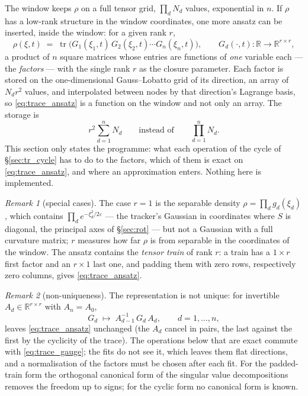 \documentclass[11pt,a4paper]{article}
\newcommand{\R}{\mathbb{R}}
\newcommand{\tr}{\operatorname{tr}}
\newcommand{\eps}{\varepsilon}
\theoremstyle{plain}
\theoremstyle{definition}
\theoremstyle{remark}
\newtheorem{remark}{Remark}
\begin{document}
The window keeps $\rho$ on a full tensor grid, $\prod_dN_d$ values, exponential in $n$. If $\rho$ has a low-rank structure in the window coordinates, one more ansatz can be inserted, inside the window: for a given rank $r$,
\begin{equation}
  \boxed{\;\rho(\xi,t) \;=\; \tr\big(G_1(\xi_1,t)\,G_2(\xi_2,t)\cdots G_n(\xi_n,t)\big),
  \qquad G_d(\cdot,t):\R\to\R^{r\times r},\;}
  \label{eq:trace_ansatz}
\end{equation}
a product of $n$ square matrices whose entries are functions of \emph{one} variable each --- the \emph{factors} --- with the single rank $r$ as the closure parameter. Each factor is stored on the one-dimensional Gauss--Lobatto grid of its direction, an array of $N_dr^2$ values, and interpolated between nodes by that direction's Lagrange basis, so \eqref{eq:trace_ansatz} is a function on the window and not only an array. The storage is
\begin{equation}
  r^2\sum_{d=1}^nN_d \qquad\text{instead of}\qquad \prod_{d=1}^nN_d .
  \label{eq:trace_storage}
\end{equation}
This section only states the programme: what each operation of the cycle of \S\ref{sec:tr_cycle} has to do to the factors, which of them is exact on \eqref{eq:trace_ansatz}, and where an approximation enters. Nothing here is implemented.

\begin{remark}[special cases]
The case $r=1$ is the separable density $\rho=\prod_dg_d(\xi_d)$, which contains $\prod_de^{-\xi_d^2/2\eps}$ --- the tracker's Gaussian in coordinates where $S$ is diagonal, the principal axes of \S\ref{sec:rot} --- but not a Gaussian with a full curvature matrix; $r$ measures how far $\rho$ is from separable in the coordinates of the window. The ansatz contains the \emph{tensor train} of rank $r$: a train has a $1\times r$ first factor and an $r\times1$ last one, and padding them with zero rows, respectively zero columns, gives \eqref{eq:trace_ansatz}.
\end{remark}

\begin{remark}[non-uniqueness]
\label{rem:gauge}
The representation is not unique: for invertible $A_d\in\R^{r\times r}$ with $A_n=A_0$,
\begin{equation}
  G_d \;\mapsto\; A_{d-1}^{-1}\,G_d\,A_d, \qquad d=1,\dots,n,
  \label{eq:trace_gauge}
\end{equation}
leaves \eqref{eq:trace_ansatz} unchanged (the $A_d$ cancel in pairs, the last against the first by the cyclicity of the trace). The operations below that are exact commute with \eqref{eq:trace_gauge}; the fits do not see it, which leaves them flat directions, and a normalisation of the factors must be chosen after each fit. For the padded-train form the orthogonal canonical form of the singular value decompositions removes the freedom up to signs; for the cyclic form no canonical form is known.
\end{remark}
\end{document}
